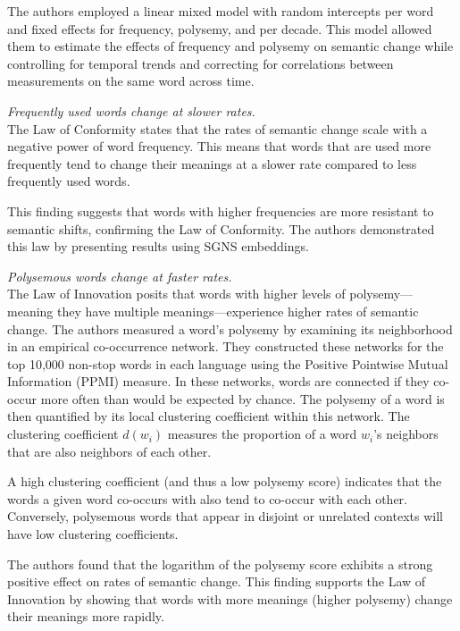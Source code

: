 The authors employed a linear mixed model with random intercepts per word and fixed effects for frequency, polysemy, and per decade.
This model allowed them to estimate the effects of frequency and polysemy on semantic change while controlling for temporal trends and correcting for correlations between measurements on the same word across time.

 \emph{Frequently used words change at slower rates.}\\
The Law of Conformity states that the rates of semantic change scale with a negative power of word frequency.
This means that words that are used more frequently tend to change their meanings at a slower rate compared to less frequently used words.

This finding suggests that words with higher frequencies are more resistant to semantic shifts, confirming the Law of Conformity.
The authors demonstrated this law by presenting results using SGNS embeddings.

 \emph{Polysemous words change at faster rates.}\\
The Law of Innovation posits that words with higher levels of polysemy—meaning they have multiple meanings—experience higher rates of semantic change.
The authors measured a word’s polysemy by examining its neighborhood in an empirical co-occurrence network.
They constructed these networks for the top 10,000 non-stop words in each language using the Positive Pointwise Mutual Information (PPMI) measure.
In these networks, words are connected if they co-occur more often than would be expected by chance.
The polysemy of a word is then quantified by its local clustering coefficient within this network.
The clustering coefficient  $d(w_i)$  measures the proportion of a word  $w_i$’s neighbors that are also neighbors of each other.

A high clustering coefficient (and thus a low polysemy score) indicates that the words a given word co-occurs with also tend to co-occur with each other. Conversely, polysemous words that appear in disjoint or unrelated contexts will have low clustering coefficients.

The authors found that the logarithm of the polysemy score exhibits a strong positive effect on rates of semantic change. This finding supports the Law of Innovation by showing that words with more meanings (higher polysemy) change their meanings more rapidly.

